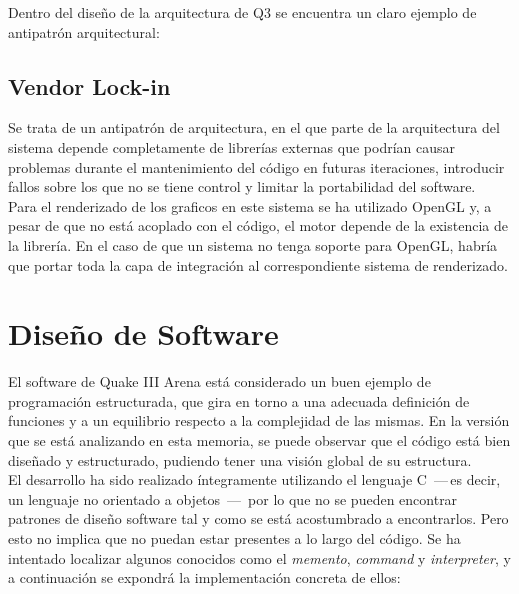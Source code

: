 \documentclass[a4paper,12pt]{report}
\begin{document}
    Dentro del diseño de la arquitectura de Q3 se encuentra un claro ejemplo de antipatrón arquitectural:
    
    \subsection{Vendor Lock-in}
    
    Se trata de un antipatrón de arquitectura, en el que parte de la arquitectura del sistema depende completamente de librerías externas que podrían causar problemas durante el mantenimiento del código en futuras iteraciones, introducir fallos sobre los que no se tiene control y limitar la portabilidad del software.\\
    \newpage
    Para el renderizado de los graficos en este sistema se ha utilizado OpenGL y, a pesar de que no está acoplado con el código, el motor depende de la existencia de la librería. En el caso de que un sistema no tenga soporte para OpenGL, habría que portar toda la capa de integración al correspondiente sistema de renderizado.  \\
  
	
	\section{Diseño de Software}
	
	El software de Quake III Arena está considerado un buen ejemplo de programación estructurada, que gira en torno a una adecuada definición de funciones y a un equilibrio respecto a la complejidad de las mismas. En la versión que se está analizando en esta memoria, se puede observar que el código está bien diseñado y estructurado, pudiendo tener una visión global de su estructura.\\
	
	El desarrollo ha sido realizado íntegramente utilizando el lenguaje C \,---\,es decir, un lenguaje no orientado a objetos \,---\, por lo que no se pueden encontrar patrones de diseño software tal y como se está acostumbrado a encontrarlos. Pero esto no implica que no puedan estar presentes a lo largo del código. Se ha intentado localizar algunos conocidos como el \textit{memento}, \textit{command} y \textit{interpreter}, y a continuación se expondrá la implementación concreta de ellos:\\
	
\end{document}
